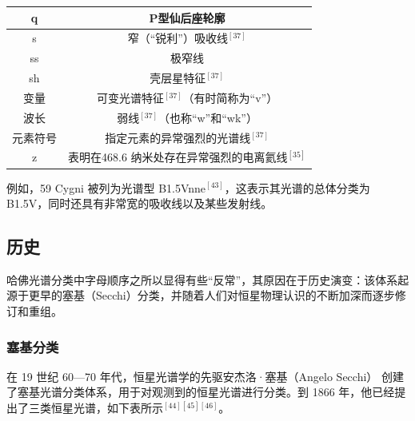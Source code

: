 \begin{table}[ht]
\begin{tabular}{|c|c|}
\hline
q & P型仙后座轮廓\\
\hline
s & 窄（“锐利”）吸收线$^{[37]}$\\
\hline
ss & 极窄线\\
\hline
sh & 壳层星特征$^{[37]}$\\
\hline
变量 & 可变光谱特征$^{[37]}$（有时简称为“v”）\\
\hline
波长 & 弱线$^{[37]}$（也称“w”和“wk”）\\
\hline
元素符号 & 指定元素的异常强烈的光谱线$^{[37]}$\\
\hline
z & 表明在468.6 纳米处存在异常强烈的电离氦线$^{[35]}$\\
\hline
\end{tabular}
\end{table}
例如，59 Cygni 被列为光谱型 B1.5Vnne$^{[43]}$，这表示其光谱的总体分类为 B1.5V，同时还具有非常宽的吸收线以及某些发射线。
\subsection{历史}
哈佛光谱分类中字母顺序之所以显得有些“反常”，其原因在于历史演变：该体系起源于更早的塞基（Secchi）分类，并随着人们对恒星物理认识的不断加深而逐步修订和重组。
\subsubsection{塞基分类}
在 19 世纪 60—70 年代，恒星光谱学的先驱安杰洛·塞基（Angelo Secchi） 创建了塞基光谱分类体系，用于对观测到的恒星光谱进行分类。到 1866 年，他已经提出了三类恒星光谱，如下表所示$^{[44][45][46]}$。

